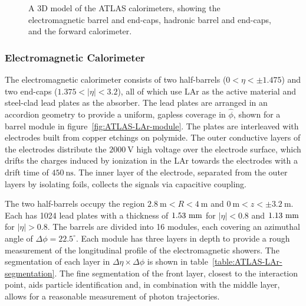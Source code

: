 \begin{figure}[htbp]
	\centering
	\caption{A 3D model of the ATLAS calorimeters, showing the electromagnetic barrel and end-caps, hadronic barrel and end-caps, and the forward calorimeter.}
	\label{fig:ATLAS-calorimeters}
\end{figure}


\subsubsection{Electromagnetic Calorimeter}\label{sec:ATLAS-calorimeters-ecal}

The electromagnetic calorimeter consists of two half-barrels ($0<\eta<\pm1.475$) and two end-caps ($1.375<|\eta|<3.2$), all of which use LAr as the active material and steel-clad lead plates as the absorber. The lead plates are arranged in an accordion geometry to provide a uniform, gapless coverage in $\hat{\phi}$, shown for a barrel module in figure~\ref{fig:ATLAS-LAr-module}. The plates are interleaved with electrodes built from copper etchings on polymide. The outer conductive layers of the electrodes distribute the $2000~\mbox{V}$ high voltage over the electrode surface, which drifts the charges induced by ionization in the LAr towards the electrodes with a drift time of $450~\mbox{ns}$. The inner layer of the electrode, separated from the outer layers by isolating foils, collects the signals via capacitive coupling.

The two half-barrels occupy the region $2.8~\mbox{m}<R<4~\mbox{m}$ and $0~\mbox{m}<z<\pm3.2~\mbox{m}$. Each has 1024 lead plates with a thickness of $1.53~\mathrm{mm}$ for $|\eta|<0.8$ and $1.13~\mathrm{mm}$ for $|\eta|>0.8$. The barrels are divided into 16 modules, each covering an azimuthal angle of $\Delta \phi = 22.5^{\circ}$. Each module has three layers in depth to provide a rough measurement of the longitudinal profile of the electromagnetic showers. The segmentation of each layer in $\Delta\eta\times\Delta\phi$ is shown in table~\ref{table:ATLAS-LAr-segmentation}. The fine segmentation of the front layer, closest to the interaction point, aids particle identification and, in combination with the middle layer, allows for a reasonable measurement of photon trajectories.  

